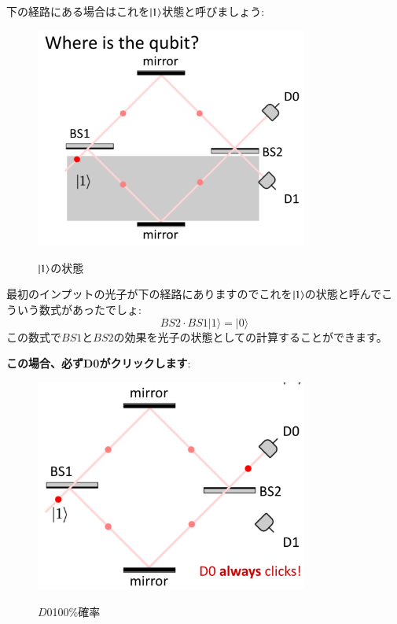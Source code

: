 下の経路にある場合はこれを$\ket{1}$状態と呼びましょう:
\begin{figure}[H]
   \centering
    \includegraphics[width=0.8\textwidth]{lesson6/1_ket_bottom.pdf}
    \label{fig: 1}
    \begin{center}
        \caption{$\ket{1}$の状態}
    \end{center}
\end{figure}

最初のインプットの光子が下の経路にありますのでこれを$\ket{1}$の状態と呼んでこういう数式があったでしょ:
\begin{equation}
B S 2 \cdot B S 1|1\rangle=|0\rangle
\end{equation}
この数式で$BS1$と$BS2$の効果を光子の状態としての計算することができます。

\textbf{この場合、必ずD0がクリックします}:
\begin{figure}[H]
   \centering
    \includegraphics[width=0.8\textwidth]{lesson6/d0_always_clicks.pdf}
    \label{fig: 1}
    \begin{center}
        \caption{$D0$100\%確率}
    \end{center}
\end{figure}

